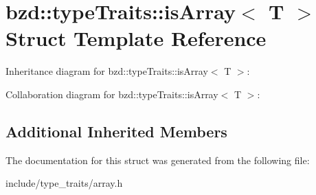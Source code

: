 \hypertarget{structbzd_1_1typeTraits_1_1isArray}{}\section{bzd\+:\+:type\+Traits\+:\+:is\+Array$<$ T $>$ Struct Template Reference}
\label{structbzd_1_1typeTraits_1_1isArray}


Inheritance diagram for bzd\+:\+:type\+Traits\+:\+:is\+Array$<$ T $>$\+:


Collaboration diagram for bzd\+:\+:type\+Traits\+:\+:is\+Array$<$ T $>$\+:
\subsection*{Additional Inherited Members}


The documentation for this struct was generated from the following file\+:\begin{DoxyCompactItemize}
\item 
include/type\+\_\+traits/array.\+h\end{DoxyCompactItemize}
